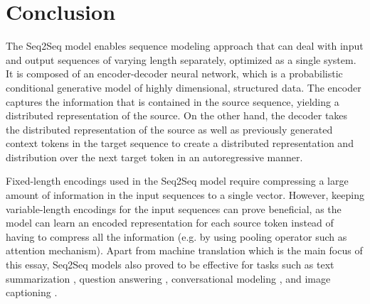 \documentclass[12pt]{extarticle}
\begin{document}




\section*{Conclusion}
The Seq2Seq model enables sequence modeling approach that can deal with input and output sequences of varying length separately, optimized as a single system. It is composed of an encoder-decoder neural network, which is a probabilistic conditional generative model of highly dimensional, structured data. The encoder captures the information that is contained in the source sequence, yielding a distributed representation of the source. On the other hand, the decoder takes the distributed representation of the source as well as previously generated context tokens in the target sequence to create a distributed representation and distribution over the next target token in an autoregressive manner.

Fixed-length encodings used in the Seq2Seq model require compressing a large amount of information in the input sequences to a single vector. However, keeping variable-length encodings for the input sequences can prove beneficial, as the model can learn an encoded representation for each source token instead of having to compress all the information (e.g. by using pooling operator such as attention mechanism). Apart from machine translation which is the main focus of this essay, Seq2Seq models also proved to be effective for tasks such as text summarization \citep{nallapati-etal-2016-abstractive}, question answering \citep{yin-etal-2016-neural-generative}, conversational modeling \citep{DBLP:journals/corr/VinyalsL15}, and image captioning \citep{pmlr-v37-xuc15, show-and-tell}. 


\newpage

\end{document}
